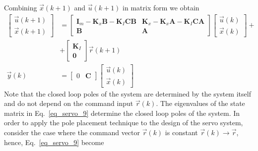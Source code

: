 \documentclass[11pt,a4paper,oneside]{book}
\numberwithin{equation}{section}
\theoremstyle{it}
\theoremstyle{definition}
\begin{document}
Combining $\vec{x}(k+1)$ and $\vec{u}(k+1)$ in matrix form we obtain
\begin{equation}\label{eq_servo_9}
	\begin{aligned}
		\begin{bmatrix}
			\vec{u}(k+1) \\[6pt]  
			\vec{x}(k+1)
		\end{bmatrix} &=
		\begin{bmatrix}
			\mathbf{I}_m-\mathbf{K}_x\mathbf{B}-\mathbf{K}_I\mathbf{C}\mathbf{B}
			&  \mathbf{K}_x-\mathbf{K}_x\mathbf{A} 
			-\mathbf{K}_I\mathbf{C}\mathbf{A} \\[6pt]
			\mathbf{B} & \mathbf{A}
		\end{bmatrix}
		\begin{bmatrix}
			\vec{u}(k) \\[6pt]  
			\vec{x}(k)
		\end{bmatrix} + \\[6pt]
		&+
		\begin{bmatrix}
			\mathbf{K}_I \\[6pt]  
			\mathbf{0}
		\end{bmatrix}\vec{r}(k+1) \\[6pt]  
		\vec{y}(k) &= 
		\begin{bmatrix}
			0 & \mathbf{C}
		\end{bmatrix}
		\begin{bmatrix}
			\vec{u}(k) \\[6pt]  
			\vec{x}(k)
		\end{bmatrix}
	\end{aligned}
\end{equation}
Note that the closed loop poles of the system are determined by the system 
itself and do not depend on the command input $\vec{r}(k)$. The eigenvalues of 
the state matrix in Eq.~\eqref{eq_servo_9} determine the closed loop poles of 
the 
system.
In order to apply the pole placement technique to the design of the servo 
system, consider the case where the command vector $\vec{r}(k)$ is constant 
$\vec{r}(k) \rightarrow\vec{r}$, hence, Eq.~\eqref{eq_servo_9} become
\end{document}

